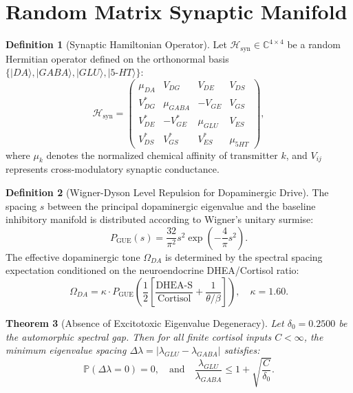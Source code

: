 \documentclass[11pt,a4paper]{article}
\newtheorem{theorem}{Theorem}[section]
\theoremstyle{definition}
\newtheorem{definition}[theorem]{Definition}
\begin{document}
\section{Random Matrix Synaptic Manifold}

\begin{definition}[Synaptic Hamiltonian Operator]
Let $\mathcal{H}_{\text{syn}} \in \mathbb{C}^{4 \times 4}$ be a random Hermitian operator defined on the orthonormal basis $\{|DA\rangle, |GABA\rangle, |GLU\rangle, |5\text{-}HT\rangle\}$:
\begin{equation}
\mathcal{H}_{\text{syn}} = \begin{pmatrix}
\mu_{DA} & V_{DG} & V_{DE} & V_{DS} \\
V_{DG}^* & \mu_{GABA} & -V_{GE} & V_{GS} \\
V_{DE}^* & -V_{GE}^* & \mu_{GLU} & V_{ES} \\
V_{DS}^* & V_{GS}^* & V_{ES}^* & \mu_{5HT}
\end{pmatrix},
\end{equation}
where $\mu_k$ denotes the normalized chemical affinity of transmitter $k$, and $V_{ij}$ represents cross-modulatory synaptic conductance.
\end{definition}

\begin{definition}[Wigner-Dyson Level Repulsion for Dopaminergic Drive]
The spacing $s$ between the principal dopaminergic eigenvalue and the baseline inhibitory manifold is distributed according to Wigner's unitary surmise:
\begin{equation}
P_{\text{GUE}}(s) = \frac{32}{\pi^2} s^2 \exp\left( - \frac{4}{\pi} s^2 \right).
\end{equation}
The effective dopaminergic tone $\Omega_{DA}$ is determined by the spectral spacing expectation conditioned on the neuroendocrine DHEA/Cortisol ratio:
\begin{equation}
\Omega_{DA} = \kappa \cdot P_{\text{GUE}}\left( \frac{1}{2}\left[ \frac{\text{DHEA-S}}{\text{Cortisol}} + \frac{1}{\theta/\beta} \right] \right), \quad \kappa = 1.60.
\end{equation}
\end{definition}

\begin{theorem}[Absence of Excitotoxic Eigenvalue Degeneracy]
Let $\delta_0 = 0.2500$ be the automorphic spectral gap. Then for all finite cortisol inputs $C < \infty$, the minimum eigenvalue spacing $\Delta\lambda = |\lambda_{GLU} - \lambda_{GABA}|$ satisfies:
\begin{equation}
\mathbb{P}(\Delta\lambda = 0) = 0, \quad \text{and} \quad \frac{\lambda_{GLU}}{\lambda_{GABA}} \le 1 + \sqrt{\frac{C}{\delta_0}}.
\end{equation}
\end{theorem}
\end{document}
